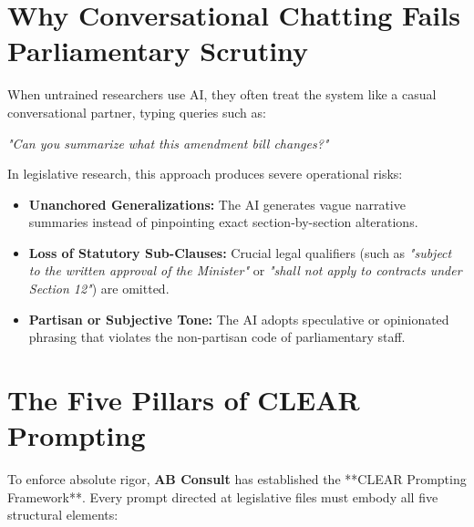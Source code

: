 \documentclass[11pt, a4paper]{report}
\begin{document}
\section{Why Conversational Chatting Fails Parliamentary Scrutiny}
When untrained researchers use AI, they often treat the system like a casual conversational partner, typing queries such as:
\begin{center}
    \textit{"Can you summarize what this amendment bill changes?"}
\end{center}
In legislative research, this approach produces severe operational risks:
\begin{itemize}[label=-]
    \item \textbf{Unanchored Generalizations:} The AI generates vague narrative summaries instead of pinpointing exact section-by-section alterations.
    \item \textbf{Loss of Statutory Sub-Clauses:} Crucial legal qualifiers (such as \textit{"subject to the written approval of the Minister"} or \textit{"shall not apply to contracts under Section 12"}) are omitted.
    \item \textbf{Partisan or Subjective Tone:} The AI adopts speculative or opinionated phrasing that violates the non-partisan code of parliamentary staff.
\end{itemize}

\section{The Five Pillars of CLEAR Prompting}
To enforce absolute rigor, \textbf{AB Consult} has established the **CLEAR Prompting Framework**. Every prompt directed at legislative files must embody all five structural elements:
\end{document}
